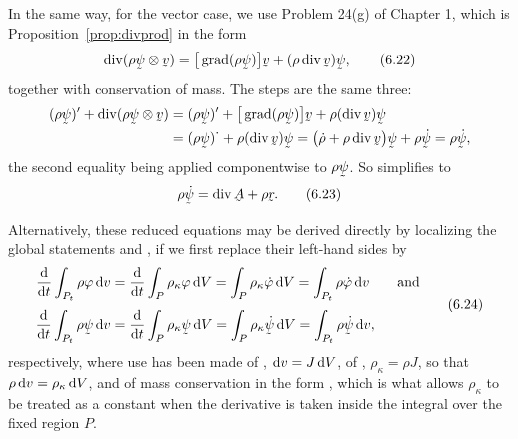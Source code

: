 In the same way, for the vector case, we use Problem 24(g) of
Chapter 1, which is Proposition~\ref{prop:divprod} in the form
\begin{equation}
   \dvg(\rho\vek\psi\otimes\bv)
   =\big[\grad(\rho\vek\psi)\big]\bv+(\rho\dvg\bv)\vek\psi ,
   \tag{6.22}\label{eq:6.22}
\end{equation}
together with conservation of mass. The steps are the same three:
\[
\begin{aligned}
   (\rho\vek\psi)'+\dvg(\rho\vek\psi\otimes\bv)
   &=(\rho\vek\psi)'+\big[\grad(\rho\vek\psi)\big]\bv
     +\rho(\dvg\bv)\vek\psi\\
   &=(\rho\vek\psi)^{\textstyle\cdot}+\rho(\dvg\bv)\vek\psi
    =\big(\dot\rho+\rho\dvg\bv\big)\vek\psi+\rho\dot{\vek\psi}
    =\rho\dot{\vek\psi},
\end{aligned}
\]
the second equality being  applied componentwise to
$\rho\vek\psi$. So  simplifies to
\begin{equation}
   \rho\dot{\vek\psi}=\dvg\bA+\rho\br .
   \tag{6.23}\label{eq:6.23}
\end{equation}

Alternatively, these reduced equations may be derived directly by
localizing the global statements  and , if we first
replace their left-hand sides by
\begin{equation}
\begin{aligned}
   \frac{\dl}{\dl t}\int_{P_{t}}\rho\varphi\,\dl v
   &=\frac{\dl}{\dl t}\int_{P}\rho_{\kappa}\varphi\,\dl V
    =\int_{P}\rho_{\kappa}\dot\varphi\,\dl V
    =\int_{P_{t}}\rho\dot\varphi\,\dl v
   \qquad\text{and}\\[1mm]
   \frac{\dl}{\dl t}\int_{P_{t}}\rho\vek\psi\,\dl v
   &=\frac{\dl}{\dl t}\int_{P}\rho_{\kappa}\vek\psi\,\dl V
    =\int_{P}\rho_{\kappa}\dot{\vek\psi}\,\dl V
    =\int_{P_{t}}\rho\dot{\vek\psi}\,\dl v ,
\end{aligned}
   \tag{6.24}\label{eq:6.24}
\end{equation}
respectively, where use has been made of , $\mathrm{d} v=J\,\mathrm{d} V$,
of , $\rho_{\kappa}=\rho J$, so that
$\rho\,\mathrm{d} v=\rho_{\kappa}\,\mathrm{d} V$, and of mass conservation in the
form , which is what allows $\rho_{\kappa}$ to be treated as
a constant when the derivative is taken inside the integral over the
fixed region $P$.

